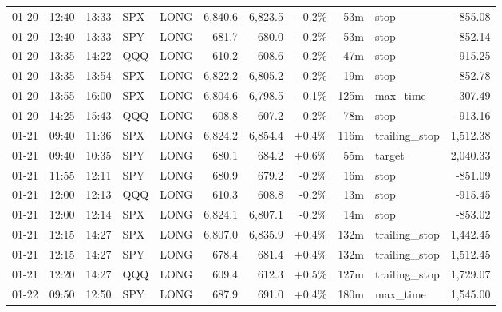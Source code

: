 \documentclass[11pt,a4paper,twoside]{article}
\begin{document}
\begin{center}
\begin{longtable}{>{\color{txtmain}}l l l l l r r r r >{\color{txtmain}}l r}
01-20 & 12:40 & 13:33 & SPX & LONG & 6,840.6 & 6,823.5 & \textcolor{lossred}{-0.2\%} & 53m & stop & \textcolor{lossred}{-855.08} \\
01-20 & 12:40 & 13:33 & SPY & LONG & 681.7 & 680.0 & \textcolor{lossred}{-0.2\%} & 53m & stop & \textcolor{lossred}{-852.14} \\
01-20 & 13:35 & 14:22 & QQQ & LONG & 610.2 & 608.6 & \textcolor{lossred}{-0.2\%} & 47m & stop & \textcolor{lossred}{-915.25} \\
01-20 & 13:35 & 13:54 & SPX & LONG & 6,822.2 & 6,805.2 & \textcolor{lossred}{-0.2\%} & 19m & stop & \textcolor{lossred}{-852.78} \\
01-20 & 13:55 & 16:00 & SPX & LONG & 6,804.6 & 6,798.5 & \textcolor{lossred}{-0.1\%} & 125m & max\_time & \textcolor{lossred}{-307.49} \\
01-20 & 14:25 & 15:43 & QQQ & LONG & 608.8 & 607.2 & \textcolor{lossred}{-0.2\%} & 78m & stop & \textcolor{lossred}{-913.16} \\
01-21 & 09:40 & 11:36 & SPX & LONG & 6,824.2 & 6,854.4 & \textcolor{wingreen}{+0.4\%} & 116m & trailing\_stop & \textcolor{wingreen}{1,512.38} \\
01-21 & 09:40 & 10:35 & SPY & LONG & 680.1 & 684.2 & \textcolor{wingreen}{+0.6\%} & 55m & target & \textcolor{wingreen}{2,040.33} \\
01-21 & 11:55 & 12:11 & SPY & LONG & 680.9 & 679.2 & \textcolor{lossred}{-0.2\%} & 16m & stop & \textcolor{lossred}{-851.09} \\
01-21 & 12:00 & 12:13 & QQQ & LONG & 610.3 & 608.8 & \textcolor{lossred}{-0.2\%} & 13m & stop & \textcolor{lossred}{-915.45} \\
01-21 & 12:00 & 12:14 & SPX & LONG & 6,824.1 & 6,807.1 & \textcolor{lossred}{-0.2\%} & 14m & stop & \textcolor{lossred}{-853.02} \\
01-21 & 12:15 & 14:27 & SPX & LONG & 6,807.0 & 6,835.9 & \textcolor{wingreen}{+0.4\%} & 132m & trailing\_stop & \textcolor{wingreen}{1,442.45} \\
01-21 & 12:15 & 14:27 & SPY & LONG & 678.4 & 681.4 & \textcolor{wingreen}{+0.4\%} & 132m & trailing\_stop & \textcolor{wingreen}{1,512.45} \\
01-21 & 12:20 & 14:27 & QQQ & LONG & 609.4 & 612.3 & \textcolor{wingreen}{+0.5\%} & 127m & trailing\_stop & \textcolor{wingreen}{1,729.07} \\
01-22 & 09:50 & 12:50 & SPY & LONG & 687.9 & 691.0 & \textcolor{wingreen}{+0.4\%} & 180m & max\_time & \textcolor{wingreen}{1,545.00} \\

\end{longtable}
\end{center}
\end{document}
